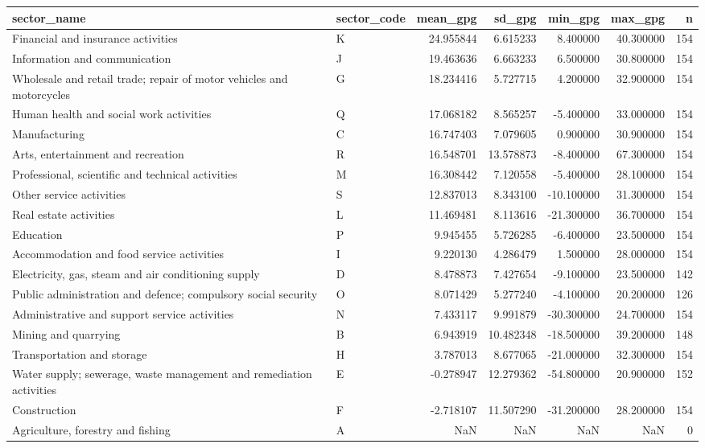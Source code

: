 \begin{tabular}{llrrrrr}
\toprule
sector_name & sector_code & mean_gpg & sd_gpg & min_gpg & max_gpg & n \\
\midrule
Financial and insurance activities & K & 24.955844 & 6.615233 & 8.400000 & 40.300000 & 154 \\
Information and communication & J & 19.463636 & 6.663233 & 6.500000 & 30.800000 & 154 \\
Wholesale and retail trade; repair of motor vehicles and motorcycles & G & 18.234416 & 5.727715 & 4.200000 & 32.900000 & 154 \\
Human health and social work activities & Q & 17.068182 & 8.565257 & -5.400000 & 33.000000 & 154 \\
Manufacturing & C & 16.747403 & 7.079605 & 0.900000 & 30.900000 & 154 \\
Arts, entertainment and recreation & R & 16.548701 & 13.578873 & -8.400000 & 67.300000 & 154 \\
Professional, scientific and technical activities & M & 16.308442 & 7.120558 & -5.400000 & 28.100000 & 154 \\
Other service activities & S & 12.837013 & 8.343100 & -10.100000 & 31.300000 & 154 \\
Real estate activities & L & 11.469481 & 8.113616 & -21.300000 & 36.700000 & 154 \\
Education & P & 9.945455 & 5.726285 & -6.400000 & 23.500000 & 154 \\
Accommodation and food service activities & I & 9.220130 & 4.286479 & 1.500000 & 28.000000 & 154 \\
Electricity, gas, steam and air conditioning supply & D & 8.478873 & 7.427654 & -9.100000 & 23.500000 & 142 \\
Public administration and defence; compulsory social security & O & 8.071429 & 5.277240 & -4.100000 & 20.200000 & 126 \\
Administrative and support service activities & N & 7.433117 & 9.991879 & -30.300000 & 24.700000 & 154 \\
Mining and quarrying & B & 6.943919 & 10.482348 & -18.500000 & 39.200000 & 148 \\
Transportation and storage & H & 3.787013 & 8.677065 & -21.000000 & 32.300000 & 154 \\
Water supply; sewerage, waste management and remediation activities & E & -0.278947 & 12.279362 & -54.800000 & 20.900000 & 152 \\
Construction & F & -2.718107 & 11.507290 & -31.200000 & 28.200000 & 154 \\
Agriculture, forestry and fishing & A & NaN & NaN & NaN & NaN & 0 \\
\bottomrule
\end{tabular}
